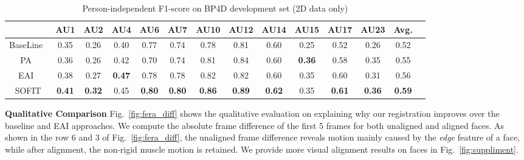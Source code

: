 \documentclass[10pt,journal]{IEEEtran}
\begin{document}
\begin{table}[htbp]
\caption{Person-independent F1-score on BP4D development set (2D data only)}
\begin{center}
\label{table:bp}
\begin{tabular}{cccccccccccccc}
\toprule
& AU1 & AU2 & AU4 & AU6 & AU7 & AU10 & AU12 & AU14 & AU15 & AU17 & AU23 & Avg.	\\ 
\midrule
BaseLine~\cite{FERA15}	&0.35	&0.26	&0.40	&0.77	&0.74	&0.78	&0.81	&0.60	&0.25	&0.52	&0.26	&0.52 \\
PA~\cite{Tadas_ECCV14}					&0.36	&0.26	&0.42	&0.70	&0.74	&0.81	&0.84	&0.60	&\textbf{0.36}\cellcolor[gray]{0.9}	&0.58	&0.35	&0.55 \\
EAI~\cite{Yang_SMCB12}					&0.38	&0.27	&\textbf{0.47}\cellcolor[gray]{0.9}	&0.78	&0.78	&0.82	&0.82	&0.60	&0.35	&0.60	&0.31	&0.56 \\
SOFIT														&\textbf{0.41}\cellcolor[gray]{0.9}	&\textbf{0.32}\cellcolor[gray]{0.9}	&0.45	&\textbf{0.80}\cellcolor[gray]{0.9}	&\textbf{0.80}\cellcolor[gray]{0.9}	&\textbf{0.86}\cellcolor[gray]{0.9}	&\textbf{0.89}\cellcolor[gray]{0.9}	&\textbf{0.62}\cellcolor[gray]{0.9}	&0.35	&\textbf{0.61}\cellcolor[gray]{0.9}	&\textbf{0.36}\cellcolor[gray]{0.9}	&\textbf{0.59}\cellcolor[gray]{0.9} \\
\bottomrule
\end{tabular}
\end{center}
\end{table}



\noindent \textbf{Qualitative Comparison}
Fig.~\ref{fig:fera_diff} shows the qualitative evaluation on explaining why our registration improves over the baseline and EAI approaches. We compute the absolute frame difference of the first 5 frames for both unaligned and aligned faces. As shown in the row 6 and 3 of Fig.~\ref{fig:fera_diff}, the unaligned frame difference reveals motion mainly caused by the \textit{edge} feature of a face, while after alignment, the non-rigid muscle motion is retained. We provide more visual alignment results on faces in Fig.~\ref{fig:suppliment}.
\end{document}
